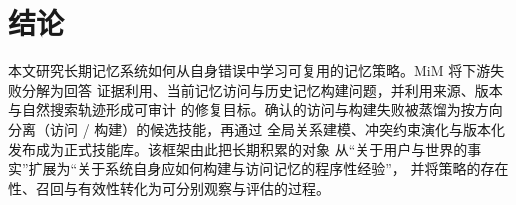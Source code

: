\documentclass[UTF8,11pt]{ctexart}
\begin{document}
%

\section{结论}
\label{sec:conclusion}

本文研究长期记忆系统如何从自身错误中学习可复用的记忆策略。MiM 将下游失败分解为回答
证据利用、当前记忆访问与历史记忆构建问题，并利用来源、版本与自然搜索轨迹形成可审计
的修复目标。确认的访问与构建失败被蒸馏为按方向分离（访问 / 构建）的候选技能，再通过
全局关系建模、冲突约束演化与版本化发布成为正式技能库。该框架由此把长期积累的对象
从“关于用户与世界的事实”扩展为“关于系统自身应如何构建与访问记忆的程序性经验”，
并将策略的存在性、召回与有效性转化为可分别观察与评估的过程。
\end{document}
